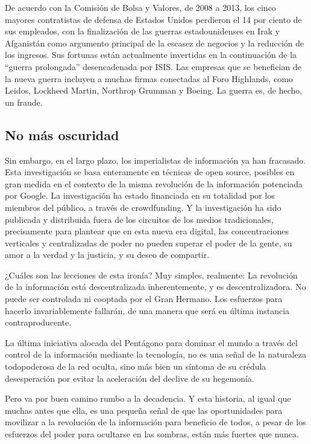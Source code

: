 \documentclass[10pt,a5paper,twoside,spanish,]{book}
\begin{document}
De acuerdo con la Comisión de Bolsa y Valores, de 2008 a 2013, los cinco
mayores contratistas de defensa de Estados Unidos perdieron el 14 por
ciento de sus empleados, con la finalización de las guerras
estadounidenses en Irak y Afganistán como argumento principal de la
escasez de negocios y la reducción de los ingresos. Sus fortunas están
actualmente invertidas en la continuación de la ``guerra prolongada''
desencadenada por ISIS. Las empresas que se benefician de la nueva
guerra incluyen a muchas firmas conectadas al Foro Highlands, como
Leidos, Lockheed Martin, Northrop Grumman y Boeing. La guerra es, de
hecho, un fraude.

\subsection{No más oscuridad}\label{no-muxe1s-oscuridad}

Sin embargo, en el largo plazo, los imperialistas de información ya han
fracasado. Esta investigación se basa enteramente en técnicas de open
source, posibles en gran medida en el contexto de la misma revolución de
la información potenciada por Google. La investigación ha estado
financiada en su totalidad por los miembros del público, a través de
crowdfunding. Y la investigación ha sido publicada y distribuida fuera
de los circuitos de los medios tradicionales, precisamente para plantear
que en esta nueva era digital, las concentraciones verticales y
centralizadas de poder no pueden superar el poder de la gente, su amor a
la verdad y la justicia, y su deseo de compartir.

¿Cuáles son las lecciones de esta ironía? Muy simples, realmente: La
revolución de la información está descentralizada inherentemente, y es
descentralizadora. No puede ser controlada ni cooptada por el Gran
Hermano. Los esfuerzos para hacerlo invariablemente fallarán, de una
manera que será en última instancia contraproducente.

La última iniciativa alocada del Pentágono para dominar el mundo a
través del control de la información mediante la tecnología, no es una
señal de la naturaleza todopoderosa de la red oculta, sino más bien un
síntoma de su crédula desesperación por evitar la aceleración del
declive de su hegemonía.

Pero va por buen camino rumbo a la decadencia. Y esta historia, al igual
que muchas antes que ella, es una pequeña señal de que las oportunidades
para movilizar a la revolución de la información para beneficio de
todos, a pesar de los esfuerzos del poder para ocultarse en las sombras,
están más fuertes que nunca.
\end{document}
